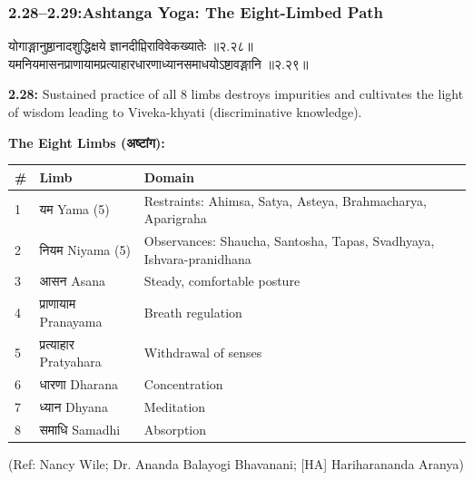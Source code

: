 \begin{frame}[fragile]\frametitle{2.28–2.29:Ashtanga Yoga: The Eight-Limbed Path}

\begin{sanskrit}
योगाङ्गानुष्ठानादशुद्धिक्षये ज्ञानदीप्तिराविवेकख्यातेः ॥२.२८॥
यमनियमासनप्राणायामप्रत्याहारधारणाध्यानसमाधयोऽष्टावङ्गानि ॥२.२९॥
\end{sanskrit}

\textbf{2.28:} Sustained practice of all 8 limbs destroys impurities and cultivates the light of wisdom leading to Viveka-khyati (discriminative knowledge).

\textbf{The Eight Limbs (अष्टांग):}
\begin{center}
{\small
\begin{tabular}{|p{0.5cm}|p{2.5cm}|p{4cm}|}
\hline
\textbf{\#} & \textbf{Limb} & \textbf{Domain} \\
\hline
1 & यम Yama (5) & Restraints: Ahimsa, Satya, Asteya, Brahmacharya, Aparigraha \\
2 & नियम Niyama (5) & Observances: Shaucha, Santosha, Tapas, Svadhyaya, Ishvara-pranidhana \\
3 & आसन Asana & Steady, comfortable posture \\
4 & प्राणायाम Pranayama & Breath regulation \\
5 & प्रत्याहार Pratyahara & Withdrawal of senses \\
6 & धारणा Dharana & Concentration \\
7 & ध्यान Dhyana & Meditation \\
8 & समाधि Samadhi & Absorption \\
\hline
\end{tabular}
}
\end{center}

\tiny{(Ref: Nancy Wile; Dr. Ananda Balayogi Bhavanani; [HA] Hariharananda Aranya)}

\end{frame}

